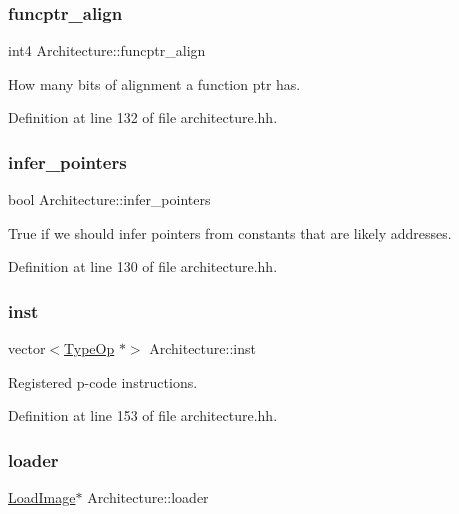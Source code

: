 \subsubsection{\texorpdfstring{funcptr\_align}{funcptr\_align}}
{\footnotesize\ttfamily int4 Architecture\+::funcptr\+\_\+align}



How many bits of alignment a function ptr has. 



Definition at line 132 of file architecture.\+hh.

\mbox{\label{class_architecture_adbeb3c604a337ce88bd4e9d8beb78806}} 
\subsubsection{\texorpdfstring{infer\_pointers}{infer\_pointers}}
{\footnotesize\ttfamily bool Architecture\+::infer\+\_\+pointers}



True if we should infer pointers from constants that are likely addresses. 



Definition at line 130 of file architecture.\+hh.

\mbox{\label{class_architecture_a3a9badb712693d9abec7e21abc20fde1}} 
\subsubsection{\texorpdfstring{inst}{inst}}
{\footnotesize\ttfamily vector$<$\mbox{\hyperlink{class_type_op}{Type\+Op}} $\ast$$>$ Architecture\+::inst}



Registered p-\/code instructions. 



Definition at line 153 of file architecture.\+hh.

\mbox{\label{class_architecture_a344b1348ed8f0bbe0d050e7038bb290d}} 
\subsubsection{\texorpdfstring{loader}{loader}}
{\footnotesize\ttfamily \mbox{\hyperlink{class_load_image}{Load\+Image}}$\ast$ Architecture\+::loader}



